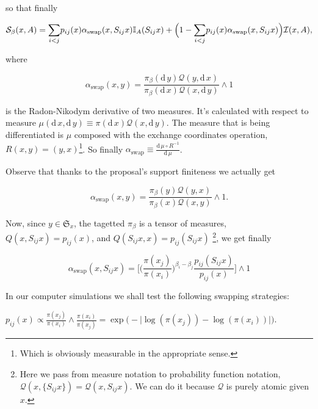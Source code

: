 so that finally

\begin{equation*}
	\mathcal{S}_{\beta}(x,A) = \underset{ i < j}{\sum} p_{ij}(x) \alpha_\text{swap} (x, S_{ij}x) \mathbb{I}_A(S_{ij} x) + \Big( 1 - \underset{ i < j}{\sum} p_{ij}(x) \alpha_\text{swap} (x, S_{ij}x)\Big) \mathcal{I}(x,A),
\end{equation*}	

where 

	$$\alpha_\text{swap}(x,y) = \frac{\pi_\beta( \mathrm{d}\, y ) \mathcal{Q}(y, \mathrm{d}\,x)}{\pi_\beta( \mathrm{d}\, x ) \mathcal{Q}(x, \mathrm{d}\,y)} \wedge 1$$

is the Radon-Nikodym derivative of two measures. It's calculated with respect to measure $ \mu (\mathrm{d}\,x, \mathrm{d}\,y) \equiv \pi(\mathrm{d}\,x) \mathcal{Q}(x, \mathrm{d}\,y)$. The measure that is being differentiated is $\mu$ composed with the exchange coordinates operation, $R(x,y) = (y,x)$\footnote{Which is obviously measurable in the appropriate sense.}. So finally $\alpha_\text{swap} \equiv \frac{\mathrm{d}\, \mu \circ R^{-1}}{\mathrm{d}\, \mu}$.

Observe that thanks to the proposal's support finiteness we actually get 

	$$\alpha_\text{swap}(x,y) =  \frac{\pi_\beta( y ) \mathcal{Q}(y, x)}{\pi_\beta( x ) \mathcal{Q}(x, y)} \wedge 1.$$


Now, since $y \in \mathfrak{S}_x $, the tagetted $\pi_\beta$ is a tensor of measures, $Q(x, S_{ij} x) = p_{ij}(x)$, and $Q( S_{ij} x, x) = p_{ij}(S_{ij}x)$ \footnote{Here we pass from measure notation to probability function notation, $\mathcal{Q}(x, \{S_{ij}x \}) = \mathcal{Q}(x, S_{ij}x)$. We can do it because $\mathcal{Q}$ is purely atomic given $x$.}, we get finally 

\begin{equation*}
	\alpha_\text{swap}(x,S_{ij} x) = \Big[  \Big(\frac{\pi(x_j)}{\pi(x_i)} \Big)^{\beta_i - \beta_j}  \frac{ p_{ij}(S_{ij} x )}{ p_{ij}( x ) }\Big] \wedge 1
\end{equation*}	

In our computer simulations we shall test the following swapping strategies:

\begin{strategy}
	\item 
		$
			p_{ij}(x) \propto 
			\frac{\pi (x_j)}{\pi( x_i )} \wedge \frac{\pi (x_i)}{\pi( x_j )} = 
			\exp \Big( - \big| \log ( \pi(x_j) ) - \log ( \pi(x_i) ) \big| \Big).
		$ 
\end{strategy}

